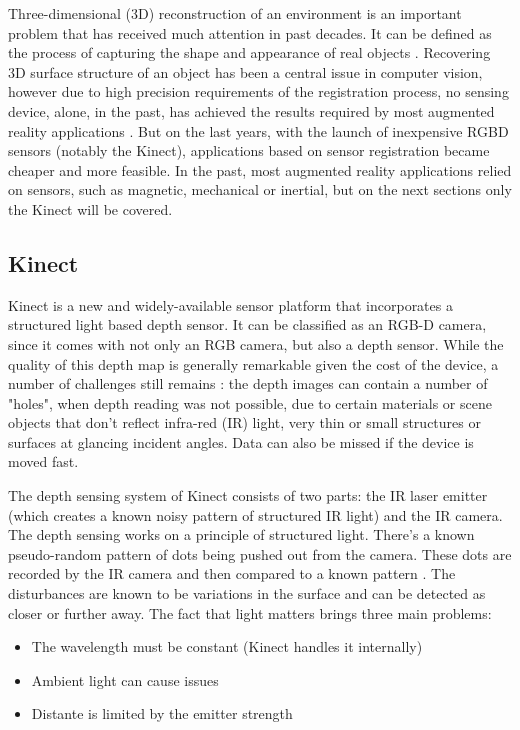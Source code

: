 \documentclass[msc, a4paper, classic, en]{ufbathesis}
\begin{document}
Three-dimensional (3D) reconstruction of an environment is an important problem that has received much attention in past decades. It can be defined as the process of capturing the shape and appearance of real objects \cite{chandra20123}. Recovering 3D surface structure of an object has been a central issue in computer vision, however due to high precision requirements of the registration process, no sensing device, alone, in the past, has achieved the results required by most augmented reality applications \cite{vall98}. But on the last years, with the launch of inexpensive RGBD sensors (notably the Kinect), applications based on sensor registration became cheaper and more feasible. In the past, most augmented reality applications relied on sensors, such as magnetic, mechanical or inertial, but on the next sections only the Kinect will be covered.

\subsection{Kinect}

Kinect \cite{kinect} is a new and widely-available sensor platform that incorporates a structured light based depth sensor. It can be classified as an RGB-D camera, since it comes with not only an RGB camera, but also a depth sensor. While the quality of this depth map is generally remarkable given the cost of the device, a number of challenges still remains \cite{kinfu2}: the depth images can contain a number of "holes", when depth reading was not possible, due to certain materials or scene objects that don't reflect infra-red (IR) light, very thin or small structures or surfaces at glancing incident angles. Data can also be missed if the device is moved fast.

The depth sensing system of Kinect consists of two parts: the IR laser emitter (which creates a known noisy pattern of structured IR light) and the IR camera. The depth sensing works on a principle of structured light. There's a known pseudo-random pattern of dots being pushed out from the camera. These dots are recorded by the IR camera and then compared to a known pattern \cite{hackingkinect}. The disturbances are known to be variations in the surface and can be detected as closer or further away. The fact that light matters brings three main problems:

\begin{itemize}
  \item The wavelength must be constant (Kinect handles it internally)
  \item Ambient light can cause issues
  \item Distante is limited by the emitter strength
\end{itemize}
\end{document}
